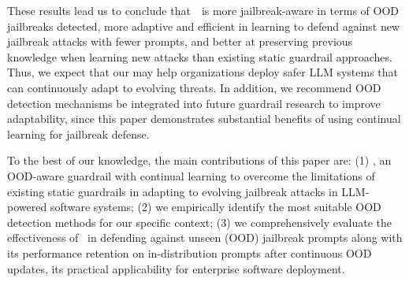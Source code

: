These results lead us to conclude that~\ourapp~is more jailbreak-aware in terms of OOD jailbreaks detected, more adaptive and efficient in learning to defend against new jailbreak attacks with fewer prompts, and better at preserving previous knowledge when learning new attacks than existing static guardrail approaches. 
Thus, we expect that our \ourapp may help organizations deploy safer LLM systems that can continuously adapt to evolving threats. 
In addition, we recommend OOD detection mechanisms be integrated into future guardrail research to improve adaptability, since this paper demonstrates substantial benefits of using continual learning for jailbreak defense.

\indent{}
To the best of our knowledge, the main contributions of this paper are:
(1) \ourapp, an OOD-aware guardrail with continual learning to overcome the limitations of existing static guardrails in adapting to evolving jailbreak attacks in LLM-powered software systems; (2) we empirically identify the most suitable OOD detection methods for our specific context; (3) we comprehensively evaluate the effectiveness of \ourapp~in defending against unseen (OOD) jailbreak prompts along with its performance retention on in-distribution prompts after continuous OOD updates, its practical applicability for enterprise software deployment.


